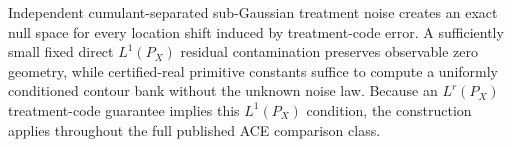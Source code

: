 Independent cumulant-separated sub-Gaussian treatment noise creates an exact null space for every location shift induced by treatment-code error. A sufficiently small fixed direct \(L^1(P_X)\) residual contamination preserves observable zero geometry, while certified-real primitive constants suffice to compute a uniformly conditioned contour bank without the unknown noise law. Because an \(L^r(P_X)\) treatment-code guarantee implies this \(L^1(P_X)\) condition, the construction applies throughout the full published ACE comparison class.